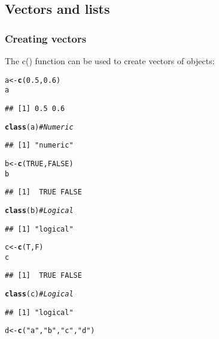 \documentclass[10pt,a4paper,twoside]{article}\usepackage[]{graphicx}\usepackage[]{xcolor}
\makeatletter
\newcommand{\hlnum}[1]{\textcolor[rgb]{0.686,0.059,0.569}{#1}}%
\newcommand{\hlsng}[1]{\textcolor[rgb]{0.192,0.494,0.8}{#1}}%
\newcommand{\hlcom}[1]{\textcolor[rgb]{0.678,0.584,0.686}{\textit{#1}}}%
\newcommand{\hldef}[1]{\textcolor[rgb]{0.345,0.345,0.345}{#1}}%
\newcommand{\hlkwb}[1]{\textcolor[rgb]{0.69,0.353,0.396}{#1}}%
\newcommand{\hlkwd}[1]{\textcolor[rgb]{0.737,0.353,0.396}{\textbf{#1}}}%
\newenvironment{kframe}{%
 \def\at@end@of@kframe{}%
 \ifinner\ifhmode%
  \def\at@end@of@kframe{\end{minipage}}%
  \begin{minipage}{\columnwidth}%
 \fi\fi%
 \def\FrameCommand##1{\hskip\@totalleftmargin \hskip-\fboxsep
 \colorbox{shadecolor}{##1}\hskip-\fboxsep
     \hskip-\linewidth \hskip-\@totalleftmargin \hskip\columnwidth}%
 \MakeFramed {\advance\hsize-\width
   \@totalleftmargin\z@ \linewidth\hsize
   \@setminipage}}%
 {\par\unskip\endMakeFramed%
 \at@end@of@kframe}
\newenvironment{knitrout}{}{} %
\makeatother
\begin{document}
\subsection{Vectors and lists}

\subsubsection{Creating vectors}

The c() function can be used to create vectors of objects:

\begin{knitrout}
\color{fgcolor}\begin{kframe}
\begin{alltt}
\hldef{a} \hlkwb{<-} \hlkwd{c}\hldef{(}\hlnum{0.5}\hldef{,} \hlnum{0.6}\hldef{)}
\hldef{a}
\end{alltt}
\begin{verbatim}
## [1] 0.5 0.6
\end{verbatim}
\begin{alltt}
\hlkwd{class}\hldef{(a)} \hlcom{# Numeric}
\end{alltt}
\begin{verbatim}
## [1] "numeric"
\end{verbatim}
\begin{alltt}
\hldef{b} \hlkwb{<-} \hlkwd{c}\hldef{(}\hlnum{TRUE}\hldef{,} \hlnum{FALSE}\hldef{)}
\hldef{b}
\end{alltt}
\begin{verbatim}
## [1]  TRUE FALSE
\end{verbatim}
\begin{alltt}
\hlkwd{class}\hldef{(b)} \hlcom{# Logical}
\end{alltt}
\begin{verbatim}
## [1] "logical"
\end{verbatim}
\begin{alltt}
\hldef{c} \hlkwb{<-} \hlkwd{c}\hldef{(T, F)}
\hldef{c}
\end{alltt}
\begin{verbatim}
## [1]  TRUE FALSE
\end{verbatim}
\begin{alltt}
\hlkwd{class}\hldef{(c)} \hlcom{# Logical}
\end{alltt}
\begin{verbatim}
## [1] "logical"
\end{verbatim}
\begin{alltt}
\hldef{d} \hlkwb{<-} \hlkwd{c}\hldef{(}\hlsng{"a"}\hldef{,} \hlsng{"b"}\hldef{,} \hlsng{"c"}\hldef{,} \hlsng{"d"}\hldef{)}

\end{alltt}
\end{kframe}
\end{knitrout}
\end{document}
